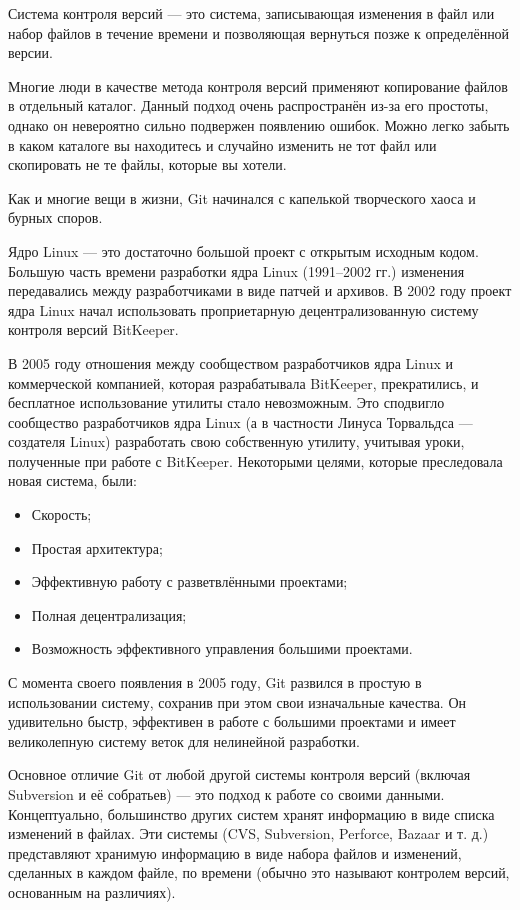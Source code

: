 Система контроля версий — это система, записывающая изменения в файл или набор файлов в течение времени и позволяющая вернуться позже к определённой версии.

Многие люди в качестве метода контроля версий применяют копирование файлов в
отдельный каталог. Данный подход очень распространён из-за его простоты, однако он невероятно сильно подвержен появлению ошибок. Можно легко забыть в каком каталоге вы находитесь и случайно изменить не тот файл или скопировать не те файлы, которые вы хотели.

Как и многие вещи в жизни, Git начинался с капелькой творческого хаоса и бурных споров.

Ядро Linux — это достаточно большой проект с открытым исходным кодом. Большую часть времени разработки ядра Linux (1991–2002 гг.) изменения передавались между разработчиками в виде патчей и архивов. В 2002 году проект ядра Linux начал использовать проприетарную децентрализованную систему контроля версий BitKeeper.

В 2005 году отношения между сообществом разработчиков ядра Linux и коммерческой компанией, которая разрабатывала BitKeeper, прекратились, и бесплатное использование утилиты стало невозможным. Это сподвигло сообщество разработчиков ядра Linux (а в частности Линуса Торвальдса — создателя Linux) разработать свою собственную утилиту, учитывая уроки, полученные при работе с BitKeeper. Некоторыми целями, которые преследовала новая система, были:
\begin{itemize}
	\item Скорость;
	\item Простая архитектура;
	\item Эффективную работу с разветвлёнными проектами;
	\item Полная децентрализация;
	\item Возможность эффективного управления большими проектами.
\end{itemize}

С момента своего появления в 2005 году, Git развился в простую в использовании систему, сохранив при этом свои изначальные качества. Он удивительно быстр, эффективен в работе с большими проектами и имеет великолепную систему веток для нелинейной разработки.

Основное отличие Git от любой другой системы контроля версий (включая Subversion и её собратьев) — это подход к работе со своими данными. Концептуально, большинство других
систем хранят информацию в виде списка изменений в файлах. Эти системы (CVS,
Subversion, Perforce, Bazaar и т. д.) представляют хранимую информацию в виде набора файлов и изменений, сделанных в каждом файле, по времени (обычно это называют контролем версий, основанным на различиях).

